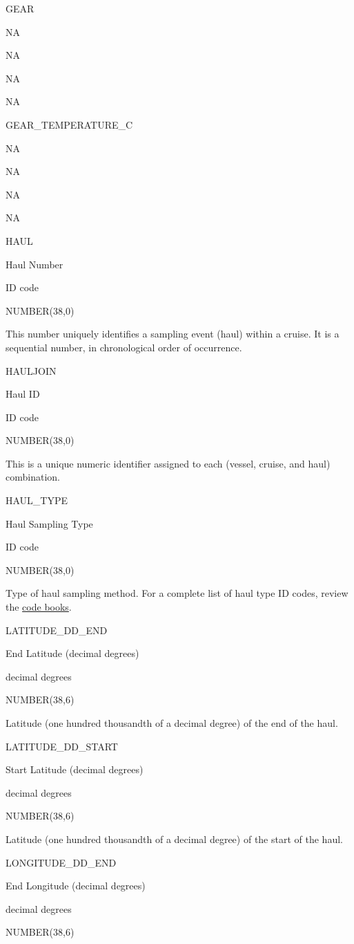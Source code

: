 \documentclass[
  letterpaper,
  oneside,
  open=any]{scrbook}
\begin{document}
GEAR

NA

NA

NA

NA

GEAR\_TEMPERATURE\_C

NA

NA

NA

NA

HAUL

Haul Number

ID code

NUMBER(38,0)

This number uniquely identifies a sampling event (haul) within a cruise.
It is a sequential number, in chronological order of occurrence.

HAULJOIN

Haul ID

ID code

NUMBER(38,0)

This is a unique numeric identifier assigned to each (vessel, cruise,
and haul) combination.

HAUL\_TYPE

Haul Sampling Type

ID code

NUMBER(38,0)

Type of haul sampling method. For a complete list of haul type ID codes,
review the
\href{https://www.fisheries.noaa.gov/resource/document/groundfish-survey-species-code-manual-and-data-codes-manual}{code
books}.

LATITUDE\_DD\_END

End Latitude (decimal degrees)

decimal degrees

NUMBER(38,6)

Latitude (one hundred thousandth of a decimal degree) of the end of the
haul.

LATITUDE\_DD\_START

Start Latitude (decimal degrees)

decimal degrees

NUMBER(38,6)

Latitude (one hundred thousandth of a decimal degree) of the start of
the haul.

LONGITUDE\_DD\_END

End Longitude (decimal degrees)

decimal degrees

NUMBER(38,6)
\end{document}
